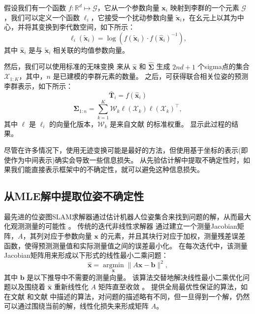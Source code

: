假设我们有一个函数 $f : \mathbb{R}^d \mapsto \mathcal{G}$，它从一个参数向量 $\mathbf{x}_i$ 映射到李群的一个元素 $\mathcal{G}$，我们可以定义一个函数 $\ell_i$，它接受一个扰动参数向量 $\tilde{\mathbf{x}}_i$，在幺元上以其为中心，并将其变换到李代数空间，如下所示： 
\begin{equation}
    \ell_i(\tilde{\mathbf{x}}_i) = \operatorname{log}( f(\tilde{\mathbf{x}}_i) \cdot f(\hat{\mathbf{x}}_i)^{-1} ),
\end{equation}
其中 $\hat{\mathbf{x}}_i$ 是与 $\tilde{\mathbf{x}}_i$ 相关联的均值参数向量。 

然后，我们可以使用标准的无味变换 \cite[(12)]{julier1997new} 来从 $\hat{\mathbf{x}}$ 和 $\hat{\boldsymbol{\Sigma}}$ 生成 $2nd + 1$ 个sigma点的集合 $\mathcal{X}_{1:K}$，其中，$n$ 是已建模的李群元素的数量。 
之后，可获得联合相关位姿的预测李群表示，如下所示： 
\begin{equation}
    \bar{\mathbf{T}}_i = f(\hat{\mathbf{x}}_i)
\end{equation}
\begin{equation}
    \boldsymbol{\Sigma}_{1:n} = \sum_{k=1}^K \mathcal{W}_k \ell(\mathcal{X}_k) \ell(\mathcal{X}_k)^\top,
\end{equation}
其中 $\ell$ 是 $\ell_i$ 的向量化版本，$\mathcal{W}_k$ 是来自文献 \cite[(12)]{julier1997new} 的标准权重。 
 显示此过程的结果。

尽管在许多情况下，使用无迹变换可能是最好的方法，但使用基于坐标的表示(即使作为中间表示)确实会导致一些信息损失。 
从先验估计解中提取不确定性时，如果我们能直接表示框架中的不确定性，就可以避免这种信息损失。 

\subsection{从MLE解中提取位姿不确定性}
\label{sec:convert:cov_extraction}

最先进的位姿图SLAM求解器通过估计机器人位姿集合来找到问题的解，从而最大化观测测量的可能性 \cite{dellaert2006a, kaess2008isam, kaess2011isam2, rosen2016sesync, jmangelson-2019a}。 
传统的迭代非线性求解器 \cite{dellaert2006a, kaess2008isam, kaess2011isam2, kummerle2011g2o} 通过建立一个测量Jacobian矩阵，$A$，其列对应于参数向量 $\mathbf{x}$ 的元素，并且其块行对应于加权，测量残差误差函数，使得预测测量值和实际测量值之间的误差最小化。 
在每次迭代中，该测量Jacobian矩阵用来形成以下形式的线性最小二乘问题： 
\begin{equation}
    \hat{\mathbf{x}} = \underset{\mathbf{x}}{\operatorname{argmin}} \lVert A \mathbf{x} - \mathbf{b} \rVert^2,
\end{equation}
其中 $\mathbf{b}$ 是以下推导中不需要的测量向量。 
该算法交替地解决线性最小二乘优化问题以及围绕着 $\hat{\mathbf{x}}$ 重新线性化 $A$ 矩阵直至收敛 \cite{dellaert2006a, kaess2008isam}。 
提供全局最优性保证的算法，如在文献 \cite{rosen2016sesync} 和文献 \cite{jmangelson-2019a} 中描述的算法，对问题的描述略有不同，但一旦得到一个解，仍然可以通过围绕当前的解，线性化损失来形成矩阵 $A$。

